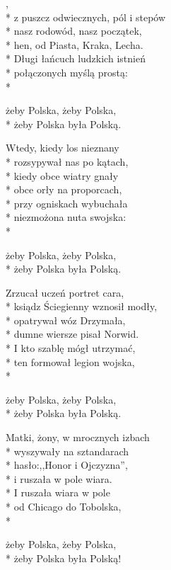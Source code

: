 \begin{lyrics}[longestline={Z głębi dziejów, z krain mrocznych,}]

,\\*
z puszcz odwiecznych, pól i stepów\\*
nasz rodowód, nasz początek,\\*
hen, od Piasta, Kraka, Lecha.\\*
Długi łańcuch ludzkich istnień\\*
połączonych myślą prostą:\\*
\begin{markverses}[atwidthof={żeby Polska, żeby Polska,}]%
żeby Polska, żeby Polska,\\*
żeby Polska była Polską.
\end{markverses}

Wtedy, kiedy los nieznany\\*
rozsypywał nas po kątach,\\*
kiedy obce wiatry gnały\\*
obce orły na proporcach,\\*
przy ogniskach wybuchała\\*
niezmożona nuta swojska:\\*
\begin{markverses}[atwidthof={żeby Polska, żeby Polska,}]%
żeby Polska, żeby Polska,\\*
żeby Polska była Polską.
\end{markverses}

Zrzucał uczeń portret cara,\\*
ksiądz Ściegienny wznosił modły,\\*
opatrywał wóz Drzymała,\\*
dumne wiersze pisał Norwid.\\*
I kto szablę mógł utrzymać,\\*
ten formował legion wojska,\\*
\begin{markverses}[atwidthof={żeby Polska, żeby Polska,}]%
żeby Polska, żeby Polska,\\*
żeby Polska była Polską.
\end{markverses}

Matki, żony, w mrocznych izbach\\*
wyszywały na sztandarach\\*
hasło:,,Honor i Ojczyzna'',\\*
i ruszała w pole wiara.\\*
I ruszała wiara w pole\\*
od Chicago do Tobolska,\\*
\begin{markverses}[atwidthof={żeby Polska, żeby Polska,}, marktext={\markstyle$\times4$}]%
żeby Polska, żeby Polska,\\*
żeby Polska była Polską!
\end{markverses}
\end{lyrics}


